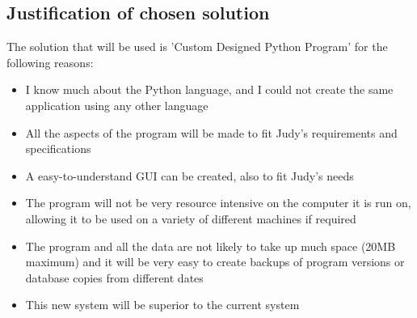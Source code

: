 \subsection{Justification of chosen solution}
The solution that will be used is 'Custom Designed Python Program' for the following reasons:
\begin{itemize}
    \item I know much about the Python language, and I could not create the same application using any other language
    \item All the aspects of the program will be made to fit Judy's requirements and specifications 
	\item A easy-to-understand GUI can be created, also to fit Judy's needs
	\item The program will not be very resource intensive on the computer it is run on, allowing it to be used on a variety of different machines if required
	\item The program and all the data are not likely to take up much space (20MB maximum) and it will be very easy to create backups of program versions or database copies from different dates
	\item This new system will be superior to the current system

\end{itemize}
